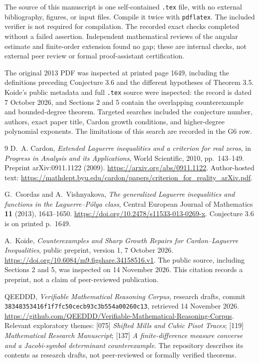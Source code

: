 \documentclass[11pt,a4paper]{article}
\theoremstyle{remark}\newtheorem{remark}[theorem]{Remark}
\begin{document}
The source of this manuscript is one self-contained \texttt{.tex} file,
with no external bibliography, figures, or input files. Compile it twice
with \texttt{pdflatex}. The included verifier is not required for
compilation. The recorded exact checks completed without a failed
assertion. Independent mathematical reviews of the angular estimate
and finite-order extension found no gap; these are internal checks,
not external peer review or formal proof-assistant certification.

The original 2013 PDF was inspected at printed page 1649, including the
definitions preceding Conjecture 3.6 and the different hypotheses of
Theorem 3.5. Koide's public metadata and full \texttt{.tex} source were
inspected: the record is dated 7 October 2026, and Sections 2 and 5
contain the overlapping counterexample and bounded-degree theorem.
Targeted searches included the conjecture number, authors, exact paper
title, Cardon growth conditions, and higher-degree polynomial
exponents. The limitations of this search are recorded in the G6 row.

\begin{thebibliography}{9}
D.~A. Cardon,
\emph{Extended Laguerre inequalities and a criterion for real zeros},
in \emph{Progress in Analysis and its Applications}, World Scientific,
2010, pp.~143--149. Preprint arXiv:0911.1122 (2009).
\url{https://arxiv.org/abs/0911.1122}.
Author-hosted text:
\url{https://mathdept.byu.edu/cardon/papers/criterion_for_reality_arXiv.pdf}.

G.~Csordas and A.~Vishnyakova,
\emph{The generalized Laguerre inequalities and functions in the
Laguerre--P\'olya class}, Central European Journal of Mathematics
\textbf{11} (2013), 1643--1650.
\url{https://doi.org/10.2478/s11533-013-0269-x}.
Conjecture 3.6 is on printed p.~1649.

A.~Koide,
\emph{Counterexamples and Sharp Growth Repairs for Cardon--Laguerre
Inequalities}, public preprint, version 1, 7 October 2026.
\url{https://doi.org/10.6084/m9.figshare.34158516.v1}.
The public source, including Sections 2 and 5, was inspected on
14 November 2026. This citation records a preprint, not a claim of
peer-reviewed publication.

QEEDDD, \emph{Verifiable Mathematical Reasoning Corpus}, research drafts,
commit \texttt{38348353416f1f7fc50cecb93c3b554a00260c13},
retrieved 14 November 2026.
\url{https://github.com/QEEDDD/Verifiable-Mathematical-Reasoning-Corpus}.
Relevant exploratory themes: [075] \emph{Shifted Mills and Cubic Pisot
Traces}; [119] \emph{Mathematical Research Manuscript}; [137]
\emph{A finite-difference measure converse and a Jacobi-symbol
determinant counterexample}. The repository describes its contents as
research drafts, not peer-reviewed or formally verified theorems.
\end{thebibliography}
\end{document}
